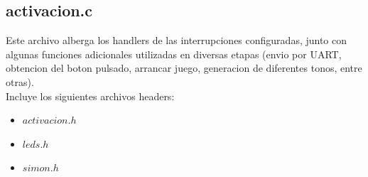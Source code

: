 \documentclass[paper=letter, fontsize=12pt]{article}
\begin{document}
\subsection{\textbf{activacion.c}}
 Este archivo alberga los handlers de las interrupciones configuradas, junto con algunas funciones adicionales utilizadas en diversas etapas (envio por UART, obtencion del boton pulsado, arrancar juego, generacion de diferentes tonos, entre otras). \\
 Incluye los siguientes archivos headers:
 \begin{itemize}
 \item $activacion.h$
 \item $leds.h$
 \item$simon.h$
 \end{itemize}
 \hfill \break
\clearpage
\end{document}
